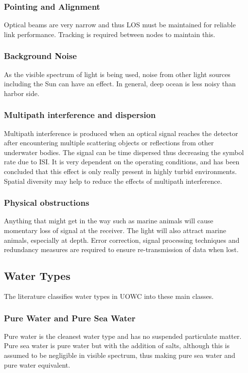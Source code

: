 \documentclass{article}
\begin{document}
\subsubsection{Pointing and Alignment}
Optical beams are very narrow and thus LOS must be maintained for reliable link performance. Tracking is required between nodes to maintain this.

\subsubsection{Background Noise}
As the visible spectrum of light is being used, noise from other light sources including the Sun can have an effect. In general, deep ocean is less noisy than harbor side.

\subsubsection{Multipath interference and dispersion}
Multipath interference is produced when an optical signal reaches the detector after encountering multiple scattering objects or reflections from other underwater bodies. The signal can be time dispersed thus decreasing the symbol rate due to \ac{ISI}. It is very dependent on the operating conditions, and has been concluded that this effect is only really present in highly turbid environments. Spatial diversity may help to reduce the effects of multipath interference.

\subsubsection{Physical obstructions}
Anything that might get in the way such as marine animals will cause momentary loss of signal at the receiver. The light will also attract marine animals, especially at depth. Error correction, signal processing techniques and redundancy measures are required to ensure re-transmission of data when lost.



\subsection{Water Types}
The literature classifies water types in \ac{UOWC} into these main classes.

\subsubsection{Pure Water and Pure Sea Water}
Pure water is the cleanest water type and has no suspended particulate matter. Pure sea water is pure water but with the addition of salts, although this is assumed to be negligible in visible spectrum, thus making pure sea water and pure water equivalent.
\end{document}
